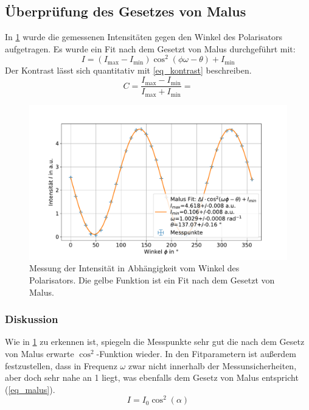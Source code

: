 \documentclass[
	a4paper,
	12pt,
	pagesize,
	ngerman
]{scrartcl}
\begin{document}
		\subsection{Überprüfung des Gesetzes von Malus}\label{ss_malus}
		In \cref{fig_malus} wurde die gemessenen Intensitäten gegen den Winkel des Polarisators aufgetragen.
		Es wurde ein Fit nach dem Gesetzt von Malus durchgeführt mit:
		\begin{equation}
			\label{eq_malus_fit}
			I = (I_\text{max}-I_\text{min})\cos^2(\phi\omega-\theta) +I_\text{min}
		\end{equation}
		Der Kontrast lässt sich quantitativ mit \cref{eq_kontrast} beschreiben.
		\begin{equation}
			\label{eq_kontrast}
			C = \frac{I_\text{max}-I_\text{min}}{I_\text{max}+I_\text{min}}= 
		\end{equation}

	\begin{figure}[H]
			\includegraphics[width=0.8\linewidth]{img/malus}
			\caption{
			Messung der Intensität in Abhängigkeit vom Winkel des Polarisators.
			Die gelbe Funktion ist ein Fit nach dem Gesetzt von Malus.
			}
			\label{fig_malus}
	\end{figure}




			\subsubsection*{Diskussion}

			Wie in \cref{fig_malus} zu erkennen ist, spiegeln die Messpunkte sehr gut die nach dem Gesetz von Malus erwarte $\cos ^2$-Funktion wieder.
			In den Fitparametern ist außerdem festzustellen, dass in Frequenz $\omega$ zwar nicht innerhalb der Messunsicherheiten, aber doch sehr nahe an \num{1} liegt, was ebenfalls dem Gesetz von Malus entspricht (\cref{eq_malus}).
			\begin{equation}
				I = I_0 \cos^2(\alpha)
				\label{eq_malus}
			\end{equation}
\end{document}

